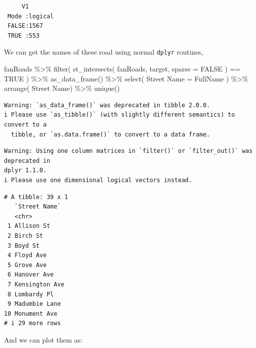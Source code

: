 \documentclass[
  letterpaper,
]{book}
\newenvironment{Shaded}{\begin{snugshade}}{\end{snugshade}}
\newcommand{\AttributeTok}[1]{\textcolor[rgb]{0.40,0.45,0.13}{#1}}
\newcommand{\ConstantTok}[1]{\textcolor[rgb]{0.56,0.35,0.01}{#1}}
\newcommand{\FunctionTok}[1]{\textcolor[rgb]{0.28,0.35,0.67}{#1}}
\newcommand{\NormalTok}[1]{\textcolor[rgb]{0.00,0.23,0.31}{#1}}
\newcommand{\OtherTok}[1]{\textcolor[rgb]{0.00,0.23,0.31}{#1}}
\newcommand{\SpecialCharTok}[1]{\textcolor[rgb]{0.37,0.37,0.37}{#1}}
\newcommand{\StringTok}[1]{\textcolor[rgb]{0.13,0.47,0.30}{#1}}
\begin{document}
\begin{verbatim}
     V1         
 Mode :logical  
 FALSE:1567     
 TRUE :553      
\end{verbatim}

We can get the names of these road using normal \texttt{dplyr} routines,

\begin{Shaded}
\begin{Highlighting}[]
\NormalTok{fanRoads }\SpecialCharTok{\%\textgreater{}\%}
  \FunctionTok{filter}\NormalTok{( }\FunctionTok{st\_intersects}\NormalTok{( fanRoads,}
\NormalTok{                         target, }
                         \AttributeTok{sparse =} \ConstantTok{FALSE}\NormalTok{ ) }\SpecialCharTok{==} \ConstantTok{TRUE}\NormalTok{ ) }\SpecialCharTok{\%\textgreater{}\%}
  \FunctionTok{as\_data\_frame}\NormalTok{() }\SpecialCharTok{\%\textgreater{}\%}
  \FunctionTok{select}\NormalTok{( }\StringTok{\textasciigrave{}}\AttributeTok{Street Name}\StringTok{\textasciigrave{}} \OtherTok{=}\NormalTok{ FullName ) }\SpecialCharTok{\%\textgreater{}\%}
  \FunctionTok{arrange}\NormalTok{( }\StringTok{\textasciigrave{}}\AttributeTok{Street Name}\StringTok{\textasciigrave{}}\NormalTok{) }\SpecialCharTok{\%\textgreater{}\%}
  \FunctionTok{unique}\NormalTok{() }
\end{Highlighting}
\end{Shaded}

\begin{verbatim}
Warning: `as_data_frame()` was deprecated in tibble 2.0.0.
i Please use `as_tibble()` (with slightly different semantics) to convert to a
  tibble, or `as.data.frame()` to convert to a data frame.
\end{verbatim}

\begin{verbatim}
Warning: Using one column matrices in `filter()` or `filter_out()` was deprecated in
dplyr 1.1.0.
i Please use one dimensional logical vectors instead.
\end{verbatim}

\begin{verbatim}
# A tibble: 39 x 1
   `Street Name` 
   <chr>         
 1 Allison St    
 2 Birch St      
 3 Boyd St       
 4 Floyd Ave     
 5 Grove Ave     
 6 Hanover Ave   
 7 Kensington Ave
 8 Lombardy Pl   
 9 Madumbie Lane 
10 Monument Ave  
# i 29 more rows
\end{verbatim}

And we can plot them as:
\end{document}
